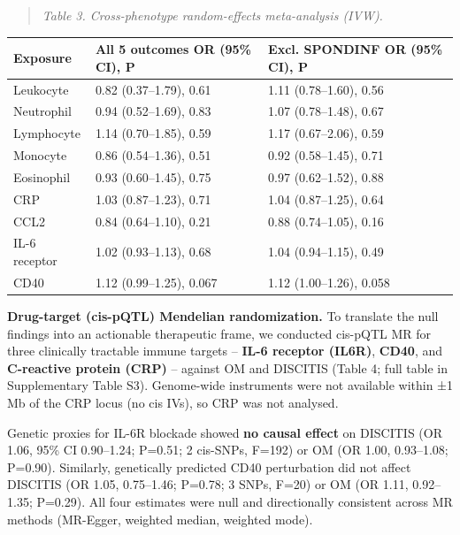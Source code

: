 \documentclass[11pt]{article}
\begin{document}
\begin{quote}\emph{Table 3. Cross-phenotype random-effects meta-analysis (IVW).}\end{quote}
\begin{table}[ht]\centering
\begin{tabular}{lll}
\toprule
Exposure & All 5 outcomes OR (95\% CI), P & Excl. SPONDINF OR (95\% CI), P \\
\midrule
Leukocyte & 0.82 (0.37--1.79), 0.61 & 1.11 (0.78--1.60), 0.56 \\
Neutrophil & 0.94 (0.52--1.69), 0.83 & 1.07 (0.78--1.48), 0.67 \\
Lymphocyte & 1.14 (0.70--1.85), 0.59 & 1.17 (0.67--2.06), 0.59 \\
Monocyte & 0.86 (0.54--1.36), 0.51 & 0.92 (0.58--1.45), 0.71 \\
Eosinophil & 0.93 (0.60--1.45), 0.75 & 0.97 (0.62--1.52), 0.88 \\
CRP & 1.03 (0.87--1.23), 0.71 & 1.04 (0.87--1.25), 0.64 \\
CCL2 & 0.84 (0.64--1.10), 0.21 & 0.88 (0.74--1.05), 0.16 \\
IL-6 receptor & 1.02 (0.93--1.13), 0.68 & 1.04 (0.94--1.15), 0.49 \\
CD40 & 1.12 (0.99--1.25), 0.067 & 1.12 (1.00--1.26), 0.058 \\
\bottomrule
\end{tabular}
\end{table}
\textbf{Drug-target (cis-pQTL) Mendelian randomization.} To translate the null findings into an actionable therapeutic frame, we conducted cis-pQTL MR for three clinically tractable immune targets -- \textbf{IL-6 receptor (IL6R)}, \textbf{CD40}, and \textbf{C-reactive protein (CRP)} -- against OM and DISCITIS (Table 4; full table in Supplementary Table S3). Genome-wide instruments were not available within ±1 Mb of the CRP locus (no cis IVs), so CRP was not analysed.

Genetic proxies for IL-6R blockade showed \textbf{no causal effect} on DISCITIS (OR 1.06, 95\% CI 0.90--1.24; P=0.51; 2 cis-SNPs, F=192) or OM (OR 1.00, 0.93--1.08; P=0.90). Similarly, genetically predicted CD40 perturbation did not affect DISCITIS (OR 1.05, 0.75--1.46; P=0.78; 3 SNPs, F=20) or OM (OR 1.11, 0.92--1.35; P=0.29). All four estimates were null and directionally consistent across MR methods (MR-Egger, weighted median, weighted mode).
\end{document}
